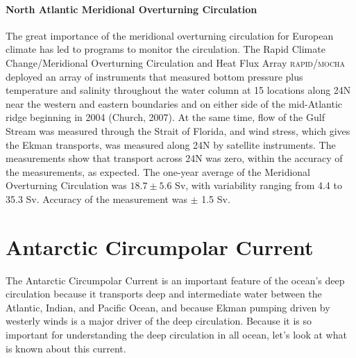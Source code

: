 \paragraph{North Atlantic Meridional Overturning Circulation}
The great importance of the meridional overturning circulation for
European climate has led to programs to monitor the circulation. The
Rapid Climate Change/Meridional Overturning Circulation and Heat Flux
Array \textsc{rapid/mocha} deployed an array of instruments that
measured bottom pressure plus temperature and salinity throughout the
water column at 15 locations along 24\degrees N near the western and
eastern boundaries and on either side of the mid-Atlantic ridge
beginning in 2004 (Church, 2007). At the same time, flow of the Gulf
Stream was measured through the Strait of Florida, and wind stress,
which gives the Ekman transports, was measured along 24\degrees N by
satellite instruments. The measurements show that transport across
24\degrees N was zero, within the accuracy of the measurements, as
expected. The one-year average of the Meridional Overturning
Circulation was $18.7 \pm 5.6$ Sv, with variability ranging from 4.4
to 35.3 Sv. Accuracy of the measurement was $\pm $ 1.5 Sv.

\section{Antarctic Circumpolar Current}
The Antarctic Circumpolar Current is an important feature of
the ocean's deep circulation because it transports deep and intermediate water between
the Atlantic, Indian, and Pacific Ocean, and because Ekman pumping
driven by westerly winds is a major driver of the deep
circulation. Because it is so important for understanding the deep
circulation in all ocean, let's look at what is known about this
current.

